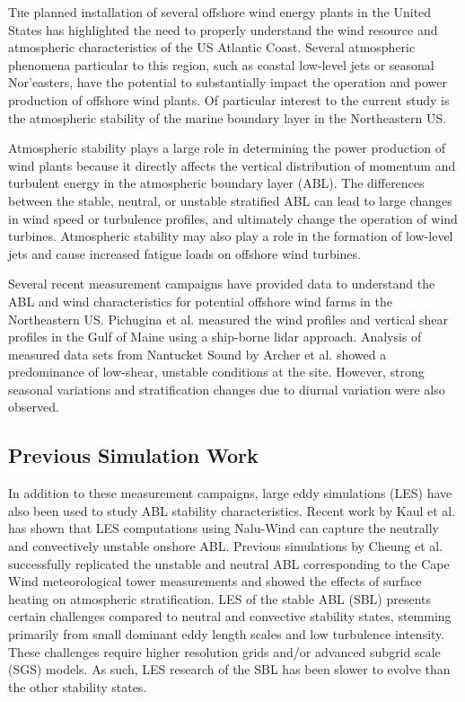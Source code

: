 \documentclass[conf]{new-aiaa}
\begin{document}
\lettrine{T}he planned installation of several offshore wind energy
plants in the United States has highlighted the need to properly
understand the wind resource and atmospheric characteristics of the US
Atlantic Coast.  Several atmospheric phenomena particular to this
region, such as coastal low-level jets or seasonal Nor’easters, have
the potential to substantially impact the operation and power
production of offshore wind plants.  Of particular interest to the
current study is the atmospheric stability of the marine boundary
layer in the Northeastern US.

Atmospheric stability plays a large role in determining the power
production of wind plants because it directly affects the vertical
distribution of momentum and turbulent energy in the atmospheric
boundary layer (ABL).  The differences between the stable, neutral, or
unstable stratified ABL can lead to large changes in wind speed or
turbulence profiles, and ultimately change the operation of wind
turbines.  Atmospheric stability may also play a role in the formation
of low-level jets \cite{nunalee2014mesoscale} and cause increased
fatigue loads on offshore wind turbines.

Several recent measurement campaigns have provided data to understand
the ABL and wind characteristics for potential offshore wind farms in
the Northeastern US.  Pichugina et al. \cite{pichugina2017properties}
measured the wind profiles and vertical shear profiles in the Gulf of
Maine using a ship-borne lidar approach.  Analysis of measured data
sets from Nantucket Sound by Archer et
al. \cite{archer2016predominance} showed a predominance of low-shear,
unstable conditions at the site.  However, strong seasonal variations
and stratification changes due to diurnal variation were also
observed.

\subsection{Previous Simulation Work}

In addition to these measurement campaigns, large eddy simulations (LES) have
also been used to study ABL stability characteristics.  Recent work by
Kaul et al. \cite{kaul2020large} has shown that LES computations using
Nalu-Wind can capture the neutrally and convectively unstable onshore
ABL.  Previous simulations by Cheung et al. \cite{cheung2020large}
successfully replicated the unstable and neutral ABL corresponding to
the Cape Wind meteorological tower measurements
\cite{archer2016predominance} and showed the effects of surface
heating on atmospheric stratification. LES of the stable ABL (SBL) presents
certain challenges compared to neutral and convective stability states, stemming
primarily from small dominant eddy length scales and low turbulence intensity.
These challenges require higher resolution grids and/or advanced subgrid
scale (SGS) models. As such, LES research of the SBL has been slower
to evolve than the other stability states.
\end{document}

